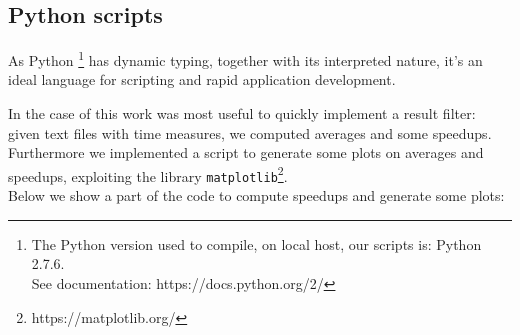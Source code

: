 	
	\subsection{Python scripts}
	As Python \footnote{The Python version used to compile, on local host, our scripts is: Python 2.7.6.\\ See documentation: https://docs.python.org/2/} has dynamic typing, together with its interpreted nature, it's an ideal language for scripting and rapid application development.
	
	In the case of this work was most useful to quickly implement a result filter: given text files with time measures, we computed averages and some speedups. \\
	Furthermore we implemented a script to generate some plots on averages and speedups, exploiting the library \texttt{matplotlib}\footnote{https://matplotlib.org/}.\\
	Below we show a part of the code to compute speedups and generate some plots:
